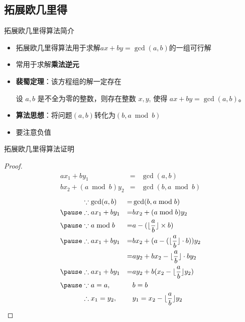 \subsection{拓展欧几里得}
\begin{frame}[fragile]{拓展欧几里得算法}{简介}
  \begin{itemize}
    \item 拓展欧几里得算法用于求解$ax+by=\gcd(a,b)$的一组可行解
    \pause
    \item 常用于求解\textbf{乘法逆元}
    \pause 
    \item \textbf{裴蜀定理}：该方程组的解一定存在
    \begin{theorem}[裴蜀定理]
      设 $a,b$ 是不全为零的整数，则存在整数 $x,y$, 使得 $ax+by=\gcd(a,b)$。      
    \end{theorem}
    \pause
    \item \textbf{算法思想}：将问题$(a,b)$转化为$(b, a\bmod b)$
    \pause
    \item 要注意负值
    
  \end{itemize}
\end{frame}

\begin{frame}[fragile]{拓展欧几里得算法}{证明}
  \begin{proof}
  \pause
$$
\begin{aligned}
  &ax_1+by_1&=&\gcd(a,b)&\\
  &bx_2+(a\bmod b)y_2&=&\gcd(b,a\bmod b)&
\end{aligned}
$$
\pause 
$$
\begin{aligned}
  &\because    \gcd(a,b)   &=& \gcd(b,a\bmod b) \\
  \pause
  &\therefore  ax_1+by_1   &=& bx_2+(a\bmod b)y_2\\
  \pause
  &\because    a\bmod b    &=& a-(\lfloor\frac{a}{b}\rfloor\times b)\\
  \pause 
  &\therefore  ax_1+by_1   &=& bx_2+(a-(\lfloor\frac{a}{b}\rfloor\cdot b))y_2\\
  &                      &=& ay_2+bx_2-\lfloor\frac{a}{b}\rfloor\cdot by_2\\
  \pause 
  &\therefore  ax_1+by_1   &=& ay_2+b(x_2-\lfloor\frac{a}{b}\rfloor y_2)\\
  \pause
  &\because    a=a,&\;&b=b  \\
  &\therefore  x_1=y_2,&\;&y_1=x_2-\lfloor\frac{a}{b}\rfloor y_2\\
\end{aligned}
$$
  \end{proof}
\end{frame}

